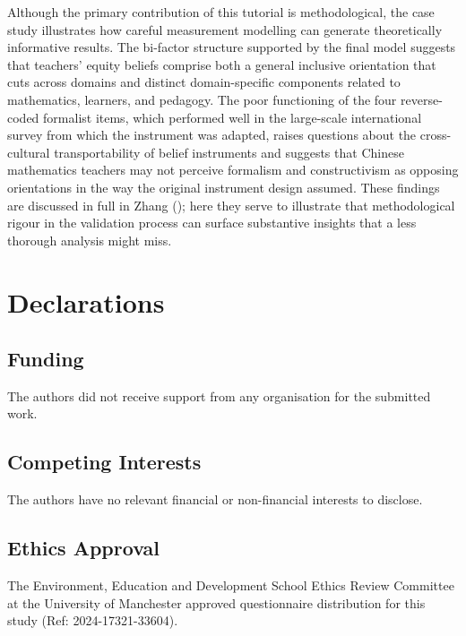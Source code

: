 \documentclass[
  man,
  floatsintext,
  longtable,
  nolmodern,
  notxfonts,
  notimes,
  colorlinks=true,linkcolor=blue,citecolor=blue,urlcolor=blue]{apa7}
\begin{document}
Although the primary contribution of this tutorial is methodological,
the case study illustrates how careful measurement modelling can
generate theoretically informative results. The bi-factor structure
supported by the final model suggests that teachers' equity beliefs
comprise both a general inclusive orientation that cuts across domains
and distinct domain-specific components related to mathematics,
learners, and pedagogy. The poor functioning of the four reverse-coded
formalist items, which performed well in the large-scale international
survey from which the instrument was adapted, raises questions about the
cross-cultural transportability of belief instruments and suggests that
Chinese mathematics teachers may not perceive formalism and
constructivism as opposing orientations in the way the original
instrument design assumed. These findings are discussed in full in Zhang
(); here they serve to illustrate
that methodological rigour in the validation process can surface
substantive insights that a less thorough analysis might miss.

\newpage

\section{Declarations}\label{declarations}

\subsection{Funding}\label{funding}

The authors did not receive support from any organisation for the
submitted work.

\subsection{Competing Interests}\label{competing-interests}

The authors have no relevant financial or non-financial interests to
disclose.

\subsection{Ethics Approval}\label{ethics-approval}

The Environment, Education and Development School Ethics Review
Committee at the University of Manchester approved questionnaire
distribution for this study (Ref: 2024-17321-33604).
\end{document}
